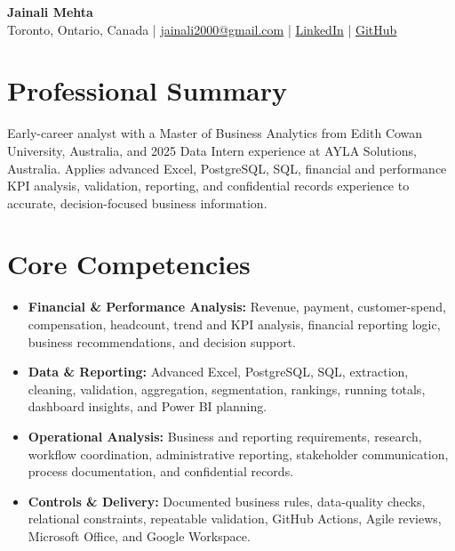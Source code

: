 \documentclass[letterpaper,10pt]{article}
\begin{document}
\begin{center}
  {\fontsize{17}{19}\selectfont\textbf{Jainali Mehta}}\\[2pt]
  \small Toronto, Ontario, Canada \;|\;
  \href{mailto:jainali2000@gmail.com}{jainali2000@gmail.com} \;|\;
  \href{https://www.linkedin.com/in/jainali-mehta}{LinkedIn} \;|\;
  \href{https://github.com/jainalimehta}{GitHub}
\end{center}
\vspace{-7pt}

\section{Professional Summary}
\small Early-career analyst with a Master of Business Analytics from Edith Cowan University, Australia, and 2025 Data Intern experience at AYLA Solutions, Australia. Applies advanced Excel, PostgreSQL, SQL, financial and performance KPI analysis, validation, reporting, and confidential records experience to accurate, decision-focused business information.

\section{Core Competencies}
\begin{itemize}[leftmargin=0.16in,label=\textbullet,topsep=0pt,itemsep=1pt,parsep=0pt]
  \item \small \textbf{Financial \& Performance Analysis:} Revenue, payment, customer-spend, compensation, headcount, trend and KPI analysis, financial reporting logic, business recommendations, and decision support.
  \item \small \textbf{Data \& Reporting:} Advanced Excel, PostgreSQL, SQL, extraction, cleaning, validation, aggregation, segmentation, rankings, running totals, dashboard insights, and Power BI planning.
  \item \small \textbf{Operational Analysis:} Business and reporting requirements, research, workflow coordination, administrative reporting, stakeholder communication, process documentation, and confidential records.
  \item \small \textbf{Controls \& Delivery:} Documented business rules, data-quality checks, relational constraints, repeatable validation, GitHub Actions, Agile reviews, Microsoft Office, and Google Workspace.
\end{itemize}
\end{document}
